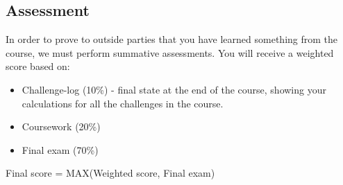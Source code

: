 \subsection{Assessment}
In order to prove to outside parties that you have learned something from the course, we must perform summative assessments. You will receive a weighted score based on:

\begin{itemize}
    \item Challenge-log (10\%) - final state at the end of the course, showing your calculations for all the challenges in the course.
    \item Coursework (20\%)
    \item Final exam (70\%)
\end{itemize}

Final score = MAX(Weighted score, Final exam)
